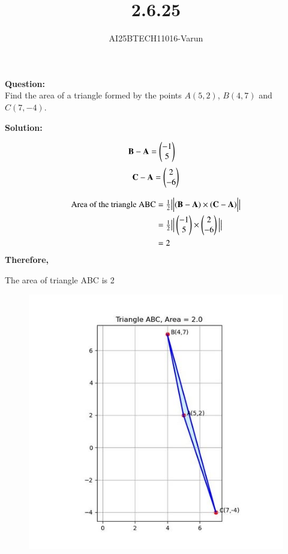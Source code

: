 \documentclass[journal]{IEEEtran}
\begin{document}

\vspace{3cm}

\title{2.6.25}
\author{AI25BTECH11016-Varun}
 \maketitle
{\let\newpage\relax\maketitle}
\renewcommand{\thefigure}{\theenumi}
\renewcommand{\thetable}{\theenumi}
\setlength{\intextsep}{10pt} %
\renewcommand{\thetable}{\theenumi}
\textbf{Question:}\\

Find the area of a triangle formed by the points  $A(5,2)$, $B(4,7)$ and $C(7,-4)$.


\textbf{Solution:}

\begin{align}
\mathbf{B - A} &= \begin{pmatrix}-1 \\ 5\end{pmatrix}
\end{align}
\begin{align}
\mathbf{C - A} = \begin{pmatrix}2 \\ -6\end{pmatrix} 
\end{align}

\begin{align}
\text{Area of the triangle ABC} &= \tfrac{1}{2} \big| \Big| (\mathbf{B - A}) \times (\mathbf{C - A}) \Big| \big| \\
&= \tfrac{1}{2} \big|  \Big| \begin{pmatrix}-1 \\ 5 \end{pmatrix} \times \begin{pmatrix}2 \\ -6 \end{pmatrix} \Big| \big| \nonumber\\
&=2 \nonumber
\end{align}
\textbf{Therefore,
}
\begin{center}
    The area of triangle ABC is 2
\end{center}


\begin{figure}[h]
    \centering
    \includegraphics[scale=0.5]{figs/2.6.25.jpg}
    \caption{}
    \label{fig:1}
\end{figure}
\end{document}
